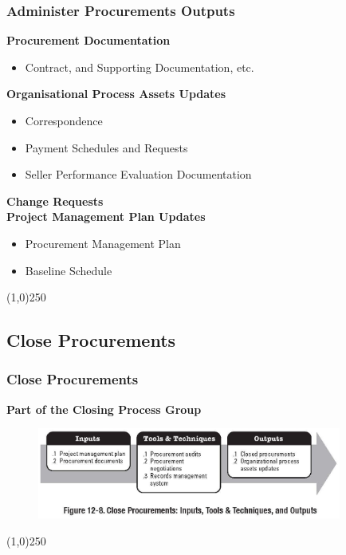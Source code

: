 \begin{frame}
\frametitle{Administer Procurements \hfill\hfill Outputs}

\textbf{Procurement Documentation}
\begin{itemize}
	\item Contract, and Supporting Documentation, etc.
\end{itemize}
\textbf{Organisational Process Assets Updates}
		\begin{itemize}
			\item Correspondence
			\item Payment Schedules and Requests
			\item Seller Performance Evaluation Documentation
		\end{itemize}
\textbf{Change Requests}\\
\textbf{Project Management Plan Updates}
		\begin{itemize}
			\item Procurement Management Plan
			\item Baseline Schedule
		\end{itemize}
\end{frame}\begin{center}\line(1,0){250}\end{center}



\subsection{Close Procurements}

\begin{frame}
\frametitle{Close Procurements}
\textbf{Part of the Closing Process Group}
\begin{figure}
	\centering
		\includegraphics[width = 10cm]{images/Fig12-8.jpg}
	\label{fig:12-8}
\end{figure}

\end{frame}\begin{center}\line(1,0){250}\end{center}





